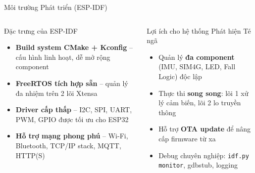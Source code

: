 
\begin{frame}{Môi trường Phát triển (ESP-IDF)}
\begin{columns}
\begin{block}{Đặc trưng của ESP-IDF}
\begin{itemize}
    \item \textbf{Build system CMake + Kconfig} 
          – cấu hình linh hoạt, dễ mở rộng component
    \item \textbf{FreeRTOS tích hợp sẵn} 
          – quản lý đa nhiệm trên 2 lõi Xtensa
    \item \textbf{Driver cấp thấp} 
          – I2C, SPI, UART, PWM, GPIO được tối ưu cho ESP32
    \item \textbf{Hỗ trợ mạng phong phú} 
          – Wi-Fi, Bluetooth, TCP/IP stack, MQTT, HTTP(S)
\end{itemize}
\end{block}

\begin{exampleblock}{Lợi ích cho hệ thống Phát hiện Té ngã}
\begin{itemize}
    \item Quản lý \textbf{đa component} (IMU, SIM4G, LED, Fall Logic) độc lập
    \item Thực thi \textbf{song song}: 
          lõi 1 xử lý cảm biến, lõi 2 lo truyền thông
    \item Hỗ trợ \textbf{OTA update} để nâng cấp firmware từ xa
    \item Debug chuyên nghiệp: \texttt{idf.py monitor}, gdbstub, logging
\end{itemize}
\end{exampleblock}
\end{columns}
\end{frame}
